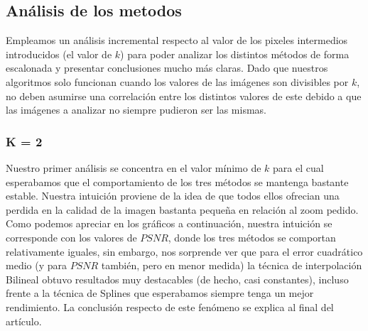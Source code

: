 \subsection{Análisis de los metodos}

Empleamos un análisis incremental respecto al valor de los pixeles intermedios introducidos (el valor de $k$) para poder analizar los distintos métodos de forma escalonada y presentar conclusiones mucho más claras. Dado que nuestros algoritmos solo funcionan cuando los valores de las imágenes son divisibles por $k$, no deben asumirse una correlación entre los distintos valores de este debido a que las imágenes a analizar no siempre pudieron ser las mismas.

\subsubsection{K = 2}
Nuestro primer análisis se concentra en el valor mínimo de $k$ para el cual esperabamos que el comportamiento de los tres métodos se mantenga bastante estable. Nuestra intuición proviene de la idea de que todos ellos ofrecian una perdida en la calidad de la imagen bastanta pequeña en relación al zoom pedido.
Como podemos apreciar en los gráficos a continuación, nuestra intuición se corresponde con los valores de $PSNR$, donde los tres métodos se comportan relativamente iguales, sin embargo, nos sorprende ver que para el error cuadrático medio (y para $PSNR$ también, pero en menor medida) la técnica de interpolación Bilineal obtuvo resultados muy destacables (de hecho, casi constantes), incluso frente a la técnica de Splines que esperabamos siempre tenga un mejor rendimiento. La conclusión respecto de este fenómeno se explica al final del artículo.

